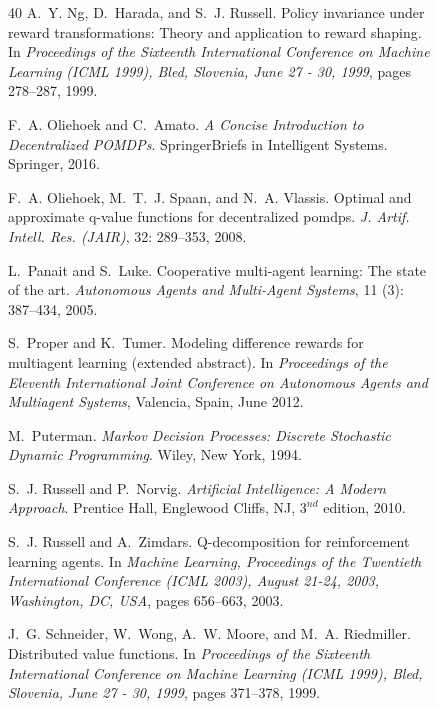 \documentclass{article}
\begin{document}
\begin{figure}
\begin{thebibliography}{40}
A.~Y. Ng, D.~Harada, and S.~J. Russell.
\newblock Policy invariance under reward transformations: Theory and
  application to reward shaping.
\newblock In \emph{Proceedings of the Sixteenth International Conference on
  Machine Learning {(ICML} 1999), Bled, Slovenia, June 27 - 30, 1999}, pages
  278--287, 1999.

F.~A. Oliehoek and C.~Amato.
\newblock \emph{A Concise Introduction to Decentralized POMDPs}.
\newblock SpringerBriefs in Intelligent Systems. Springer, 2016.

F.~A. Oliehoek, M.~T.~J. Spaan, and N.~A. Vlassis.
\newblock Optimal and approximate q-value functions for decentralized pomdps.
\newblock \emph{J. Artif. Intell. Res. {(JAIR)}}, 32: 289--353, 2008.

L.~Panait and S.~Luke.
\newblock Cooperative multi-agent learning: The state of the art.
\newblock \emph{Autonomous Agents and Multi-Agent Systems}, 11
  (3): 387--434, 2005.

S.~Proper and K.~Tumer.
\newblock Modeling difference rewards for multiagent learning (extended
  abstract).
\newblock In \emph{Proceedings of the Eleventh International Joint Conference
  on Autonomous Agents and Multiagent Systems}, Valencia, Spain, June 2012.

M.~Puterman.
\newblock \emph{{Markov} Decision Processes: Discrete Stochastic Dynamic
  Programming}.
\newblock Wiley, New York, 1994.

S.~J. Russell and P.~Norvig.
\newblock \emph{Artificial Intelligence: A Modern Approach}.
\newblock Prentice Hall, Englewood Cliffs, NJ, $3^{nd}$ edition, 2010.

S.~J. Russell and A.~Zimdars.
\newblock Q-decomposition for reinforcement learning agents.
\newblock In \emph{Machine Learning, Proceedings of the Twentieth International
  Conference {(ICML} 2003), August 21-24, 2003, Washington, DC, {USA}}, pages
  656--663, 2003.

J.~G. Schneider, W.~Wong, A.~W. Moore, and M.~A. Riedmiller.
\newblock Distributed value functions.
\newblock In \emph{Proceedings of the Sixteenth International Conference on
  Machine Learning {(ICML} 1999), Bled, Slovenia, June 27 - 30, 1999}, pages
  371--378, 1999.


\end{thebibliography}
\end{figure}
\end{document}
